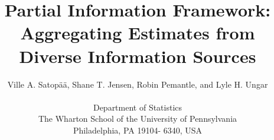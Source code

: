 \documentclass[11pt]{article}
\theoremstyle{definition}
\theoremstyle{definition}
\begin{document}
\title{Partial Information Framework: Aggregating Estimates from Diverse Information Sources}
\author{
Ville A. Satop\"a\"a, Shane T. Jensen, Robin Pemantle, and Lyle H. Ungar\\
\\
 \small Department of Statistics\\
 \small The Wharton School of the University of Pennsylvania\\
 \small Philadelphia, PA 19104- 6340, USA} 
\maketitle

\end{document}
